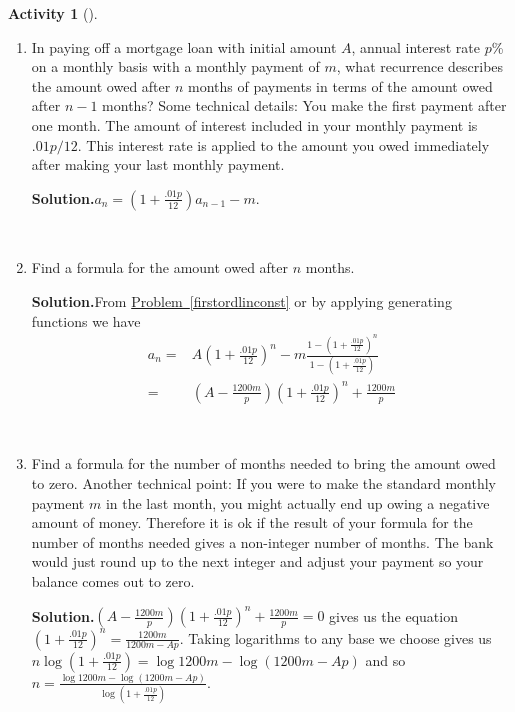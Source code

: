\documentclass[10pt,]{book}
\theoremstyle{plain}
\theoremstyle{definition}
\newtheorem{activity}[project]{Activity}
\numberwithin{equation}{chapter}
\newcommand{\amp}{&}
\begin{document}
\begin{activity}[]\label{activity-213}
~\par
\begin{enumerate}[label=(\alph*)]
 \item In paying off a mortgage loan with initial amount \(A\), annual interest rate \(p\)\% on a monthly basis with a monthly payment of \(m\), what recurrence describes the amount owed after \(n\) months of payments in terms of the amount owed after \(n-1\) months?  Some technical details: You make the first payment after one month.  The amount of interest included in your monthly payment is \(.01p/12\).  This interest rate is applied to the amount you owed immediately after making your last monthly payment.%
\par\medskip\noindent%
\textbf{Solution.}\quad \(a_n=(1+\frac{.01p}{12})a_{n-1}-m\).%

~\par
\item Find a formula for the amount owed after \(n\) months.%
\par\medskip\noindent%
\textbf{Solution.}\quad From \hyperref[firstordlinconst]{Problem~\ref{firstordlinconst}} or by applying generating functions we have%
\begin{align*}
a_n  =\amp  A(1+\frac{.01p}{12})^n-m\frac{1-(1+\frac{.01p}{12})^n}{1-(1+\frac{.01p}{12})}\\
=\amp  \left(A-\frac{1200m}{p}\right)\left(1+\frac{.01p}{12}\right)^n+\frac{1200m}{p}
\end{align*}
%

~\par
\item Find a formula for the number of months needed to bring the amount owed to zero.  Another technical point: If you were to make the standard monthly payment \(m\) in the last month, you might actually end up owing a negative amount of money.  Therefore it is ok if the result of your formula for the number of months needed gives a non-integer number of months.  The bank would just round up to the next integer and adjust your payment so your balance comes out to zero.%
\par\medskip\noindent%
\textbf{Solution.}\quad \(\left(A-\frac{1200m}{p}\right)\left(1+\frac{.01p}{12}\right)^n+\frac{1200m}{p}=0\) gives us the equation \(\left(1+\frac{.01p}{12}\right)^n=\frac{1200m}{1200m-Ap}\). Taking logarithms to any base we choose gives us \(n\log (1+\frac{.01p}{12})=\log 1200m-\log (1200m-Ap)\) and so \(n=\frac{\log 1200m-\log (1200m-Ap)}{\log (1+\frac{.01p}{12})}\).%


\end{enumerate}
\end{activity}
\end{document}
